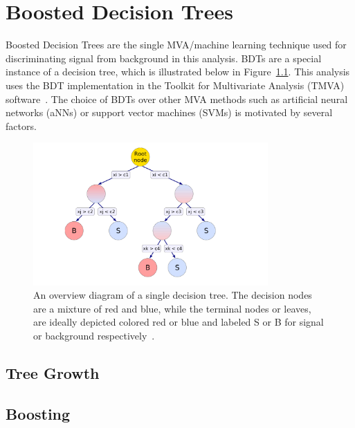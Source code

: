 %
%

\chapter{Boosted Decision Trees}
\label{app:bdts}
Boosted Decision Trees are the single MVA/machine learning technique used for discriminating signal from background
in this analysis. BDTs are a special instance of a decision tree, which is illustrated below in Figure~\ref{fig:dec_tree}.
This analysis uses the BDT implementation in the Toolkit for Multivariate Analysis (TMVA) software~\cite{tmva}.
The choice of BDTs over other MVA methods such as artificial neural networks (aNNs) or support vector machines (SVMs) is motivated
by several factors. 

\begin{figure}[hbtp]
 \begin{center}
   \includegraphics[width=0.8\textwidth]{ap2_figs/decision_tree.pdf}
   \caption[A decision tree diagram.]{An overview diagram of a single decision tree. The decision nodes are a mixture of red and blue,
     while the terminal nodes or leaves, are ideally depicted colored red or blue and labeled S or B for signal or background respectively~\cite{tmva}.}
   \label{fig:dec_tree}
 \end{center}
\end{figure}

\section{Tree Growth}

\section{Boosting}


